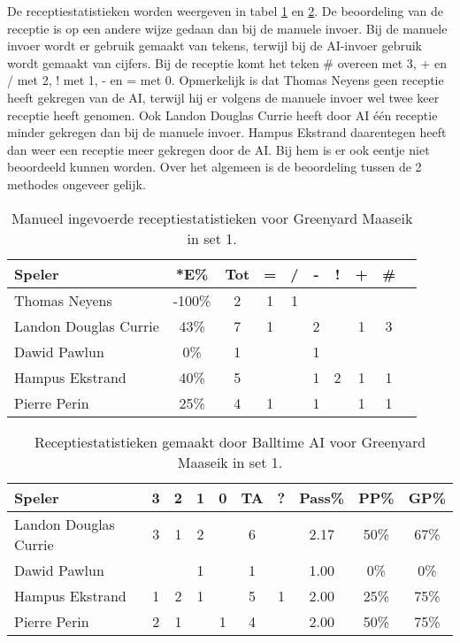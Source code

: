 De receptiestatistieken worden weergeven in tabel \ref{tab:PL3ReceiveMaaseikMan1} en  \ref{tab:PL3ReceiveMaaseikAI1}.
De beoordeling van de receptie is op een andere wijze gedaan dan bij de manuele invoer. Bij de manuele invoer wordt er gebruik gemaakt van tekens, terwijl bij de AI-invoer gebruik wordt gemaakt van cijfers. Bij de receptie komt het teken \# overeen met 3, + en / met 2, ! met 1, - en = met 0.
Opmerkelijk is dat Thomas Neyens geen receptie heeft gekregen van de AI, terwijl hij er volgens de manuele invoer wel twee keer receptie heeft genomen. Ook Landon Douglas Currie heeft door AI één receptie minder gekregen dan bij de manuele invoer. Hampus Ekstrand daarentegen heeft dan weer een receptie meer gekregen door de AI. Bij hem is er ook eentje niet beoordeeld kunnen worden. Over het algemeen is de beoordeling tussen de 2 methodes ongeveer gelijk.

\begin{table}[ht!]
    \centering
    \scriptsize
    \begin{tabular}{|l|c|c|c|c|c|c|c|c|c|} \hline
        \textbf{Speler} & *E\% & Tot & = & / & - & ! & + & \# \\ \hline
        Thomas Neyens & -100\% & 2 & 1 & 1 &  &  & & \\
        Landon Douglas Currie & 43\% & 7 & 1 &  & 2 & & 1 & 3 \\ 
        Dawid Pawlun & 0\% & 1 &  &  & 1 &  &  & \\ 
        Hampus Ekstrand & 40\% & 5 &  &  & 1 & 2 & 1 & 1 \\ 
        Pierre Perin & 25\% & 4 & 1 &  & 1 & & 1 & 1 \\ \hline
    \end{tabular}
    \caption[Manueel ingevoerde receptiestatistieken voor Greenyard Maaseik in set 1]{\label{tab:PL3ReceiveMaaseikMan1}Manueel ingevoerde receptiestatistieken voor Greenyard Maaseik in set 1.}
\end{table}

\begin{table}[ht!]
  \centering
  \scriptsize
    \begin{tabular}{|l|c|c|c|c|c|c|c|c|c|} \hline
    \textbf{Speler} & 3 & 2 & 1 & 0 & TA & ? & Pass\% & PP\% & GP\% \\ \hline
    Landon Douglas Currie & 3 & 1 & 2 &   & 6 &  & 2.17 & 50\% & 67\% \\
    Dawid Pawlun &  &  & 1 &  & 1 &  & 1.00 & 0\% & 0\% \\
    Hampus Ekstrand & 1 & 2 & 1 & & 5 & 1 & 2.00 & 25\% & 75\% \\
    Pierre Perin & 2 & 1 &  & 1 & 4 & & 2.00 & 50\% & 75\% \\  \hline
  \end{tabular}
  \caption[Receptiestatistieken gemaakt door Balltime AI voor Greenyard Maaseik in set 1]{\label{tab:PL3ReceiveMaaseikAI1}Receptiestatistieken gemaakt door Balltime AI voor Greenyard Maaseik in set 1.}
\end{table}

